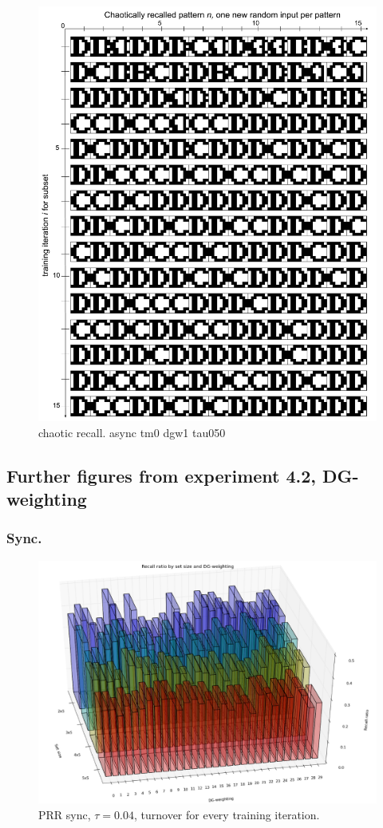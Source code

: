 \begin{figure}
    \centering
    \includegraphics[width=12cm]{fig/CD-chaotic-recall-async-tm0-dgw1-tau050}
    \caption{chaotic recall. async tm0 dgw1 tau050}
\end{figure}

\subsection*{Further figures from experiment 4.2, DG-weighting}

\subsubsection{Sync.}

\begin{figure}
    \centering
    \includegraphics[width=13cm]{fig/DGWs/cut/avg_recall_ratio_by_dgw_sync_tm1_04_cut}
    \caption{PRR sync, $\tau=0.04$, turnover for every training iteration.}
    \label{fig:avg_recall_ratio_by_dgw_sync_tm1_04}
\end{figure}

